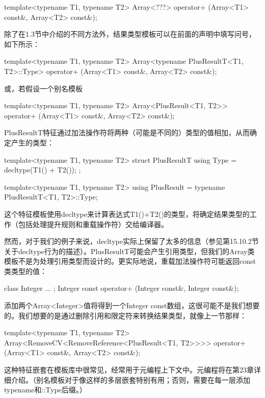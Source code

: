 \begin{cpp}
template<typename T1, typename T2>
Array<???> operator+ (Array<T1> const&, Array<T2> const&);
\end{cpp}

除了在1.3节中介绍的不同方法外，结果类型模板可以在前面的声明中填写问号，如下所示：

\begin{cpp}
template<typename T1, typename T2>
Array<typename PlusResultT<T1, T2>::Type>
operator+ (Array<T1> const&, Array<T2> const&);
\end{cpp}

或，若假设一个别名模板

\begin{cpp}
template<typename T1, typename T2>
Array<PlusResult<T1, T2>>
operator+ (Array<T1> const&, Array<T2> const&);
\end{cpp}

PlusResultT特征通过加法操作符将两种（可能是不同的）类型的值相加，从而确定产生的类型：

\begin{cpp}
template<typename T1, typename T2>
struct PlusResultT {
	using Type = decltype(T1() + T2());
};

template<typename T1, typename T2>
using PlusResult = typename PlusResultT<T1, T2>::Type;
\end{cpp}

这个特征模板使用decltype来计算表达式T1()+T2()的类型，将确定结果类型的工作（包括处理提升规则和重载操作符）交给编译器。

然而，对于我们的例子来说，decltype实际上保留了太多的信息（参见第15.10.2节关于decltype行为的描述）。PlusResultT可能会产生引用类型，但我们的Array类模板不是为处理引用类型而设计的。更实际地说，重载加法操作符可能返回const类类型的值：

\begin{cpp}
class Integer { ... };
Integer const operator+ (Integer const&, Integer const&);
\end{cpp}

添加两个Array<Integer>值将得到一个Integer const数组，这很可能不是我们想要的。我们想要的是通过删除引用和限定符来转换结果类型，就像上一节那样：

\begin{cpp}
template<typename T1, typename T2>
Array<RemoveCV<RemoveReference<PlusResult<T1, T2>>>>
operator+ (Array<T1> const&, Array<T2> const&);
\end{cpp}

这种特征嵌套在模板库中很常见，经常用于元编程上下文中。元编程将在第23章详细介绍。（别名模板对于像这样的多层嵌套特别有用；否则，需要在每一层添加typename和::Type后缀。）

